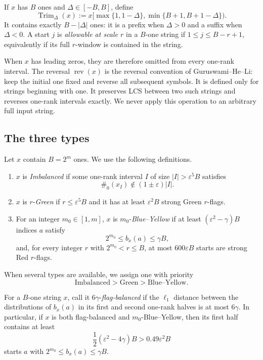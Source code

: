 \documentclass[11pt]{article}
\theoremstyle{remark}
\newcommand{\rev}{\operatorname{rev}}
\newcommand{\zeros}{\#_0}
\newcommand{\Trim}{\operatorname{Trim}}
\newcommand{\eps}{\varepsilon}
\begin{document}
If $x$ has $B$ ones and $\Delta\in[-B,B]$, define
\begin{equation}\label{eq:trim-def}
 \Trim_\Delta(x)
 :=x\bigl[\max\{1,1-\Delta\},
          \min\{B+1,B+1-\Delta\}\bigr).
\end{equation}
It contains exactly $B-|\Delta|$ ones: it is a prefix when $\Delta>0$
and a suffix when $\Delta<0$.  A start $j$ is \emph{allowable at scale $r$}
in a $B$-one string if $1\le j\le B-r+1$, equivalently if its full
$r$-window is contained in the string.

When $x$ has leading zeros, they are therefore omitted from every one-rank
interval.  The reversal $\rev(x)$ is the reversal convention of
Guruswami--He--Li: keep the initial one fixed and reverse all subsequent
symbols.  It is defined only for strings beginning with one.  It preserves
LCS between two such strings and reverses one-rank intervals exactly.  We
never apply this operation to an arbitrary full input string.

\subsection{The three types}

Let $x$ contain $B=2^m$ ones.  We use the following definitions.

\begin{enumerate}[label=(\roman*)]
\item $x$ is \emph{Imbalanced} if some one-rank interval $I$ of size
      $|I|>\eps^5B$ satisfies
      \[
       \zeros(x_I)\notin (1\pm\eps)|I|.
      \]
\item $x$ is $r$-\emph{Green} if $r\le\eps^5B$ and it has at least
      $\eps^2B$ strong Green $r$-flags.
\item For an integer $m_0\in[1,m]$, $x$ is
      $m_0$-\emph{Blue--Yellow} if at least
      $(\eps^2-\gamma)B$ indices $a$ satisfy
      \[
       2^{m_0}\le b_x(a)\le\gamma B,
      \]
      and, for every integer $r$ with $2^{m_0}<r\le B$, at most
      $600\eps B$ starts are strong Red $r$-flags.
\end{enumerate}

When several types are available, we assign one with priority
\[
 \text{Imbalanced}>\text{Green}>\text{Blue--Yellow}.
\]

For a $B$-one string $x$, call it $6\gamma$-\emph{flag-balanced} if the
$\ell_1$ distance between the distributions of $b_x(a)$ in its first
and second one-rank halves is at most $6\gamma$.  In particular, if $x$ is
both flag-balanced and $m_0$-Blue--Yellow, then its first half contains at
least
\begin{equation}\label{eq:blue-first-half}
 \frac12(\eps^2-4\gamma)B>0.49\eps^2B
\end{equation}
starts $a$ with $2^{m_0}\le b_x(a)\le\gamma B$.
\end{document}

